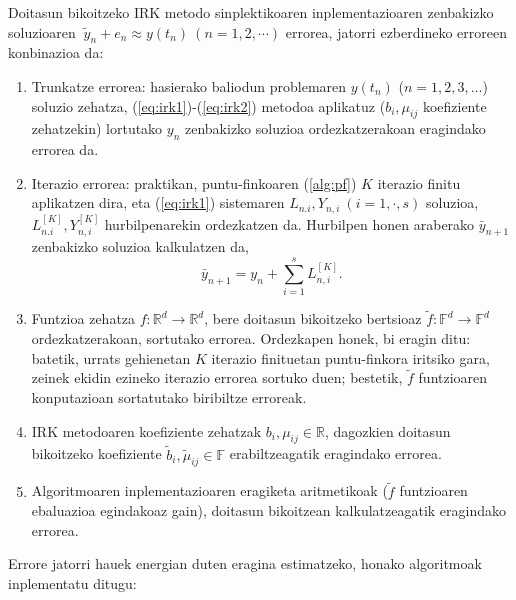 Doitasun bikoitzeko IRK metodo sinplektikoaren inplementazioaren zenbakizko soluzioaren $\ \tilde{y}_n+e_n \approx y(t_n) \ (n=1,2,\cdots)$ errorea, jatorri ezberdineko erroreen konbinazioa da:
\begin{enumerate}
\item Trunkatze errorea: hasierako baliodun problemaren $y(t_n)$ ($n=1,2,3,\dots$) soluzio zehatza, (\ref{eq:irk1})-(\ref{eq:irk2}) metodoa aplikatuz  ($b_i,\mu_{ij}$ koefiziente zehatzekin) lortutako $y_n$ zenbakizko soluzioa  ordezkatzerakoan eragindako errorea da. 
\item Iterazio errorea: praktikan, puntu-finkoaren (\ref{alg:pf}) $K$ iterazio finitu aplikatzen dira, eta (\ref{eq:irk1}) sistemaren $L_{n.i}, Y_{n,i} \ (i=1,\cdot,s)$ soluzioa, $L_{n.i}^{[K]}, Y_{n,i}^{[K]}$ hurbilpenarekin ordezkatzen da. Hurbilpen honen araberako $\bar{y}_{n+1}$ zenbakizko soluzioa kalkulatzen da,
\begin{equation*}
\bar{y}_{n+1}=y_{n}+\sum_{i=1}^{s} L_{n,i}^{[K]}.
\end{equation*}   
\item Funtzioa zehatza $f:\mathbb{R}^d \rightarrow \mathbb{R}^d$, bere doitasun bikoitzeko bertsioaz $\tilde{f}:\mathbb{F}^d \rightarrow \mathbb{F}^d$ ordezkatzerakoan, sortutako errorea.  Ordezkapen honek, bi eragin ditu: batetik, urrats gehienetan $K$ iterazio finituetan puntu-finkora iritsiko gara, zeinek  ekidin ezineko iterazio errorea sortuko duen; bestetik, $\tilde{f}$ funtzioaren konputazioan sortatutako biribiltze erroreak. 
\item IRK metodoaren koefiziente zehatzak $b_i,\mu_{ij} \in \mathbb{R}$, dagozkien doitasun bikoitzeko koefiziente $\tilde{b}_i,\tilde{\mu}_{ij} \in \mathbb{F}$ erabiltzeagatik eragindako errorea.
\item Algoritmoaren inplementazioaren eragiketa aritmetikoak ($\tilde{f}$ funtzioaren ebaluazioa egindakoaz gain), doitasun bikoitzean kalkulatzeagatik eragindako errorea.  
\end{enumerate} 

Errore jatorri hauek energian duten eragina estimatzeko, honako algoritmoak inplementatu ditugu:

